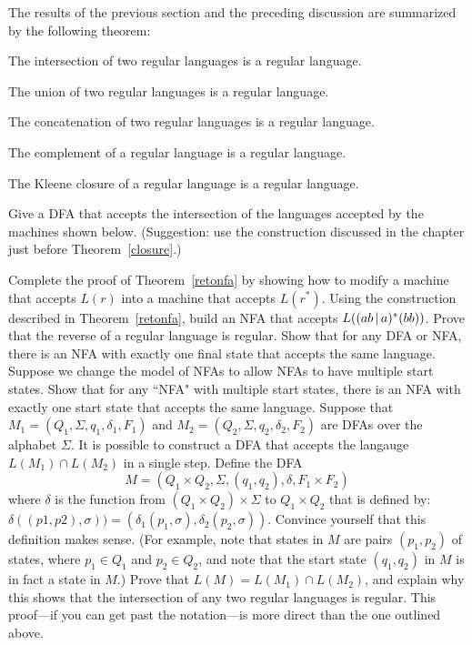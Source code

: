 The results of the previous section and the preceding discussion are summarized
by the following theorem:

\begin{theorem}\label{closure} 
The intersection  of two
regular languages is a regular language.  

The union of two
regular languages is a regular language.  

The concatenation of two
regular languages is a regular language.  

The complement of a regular language is a regular language.

The Kleene closure of a regular language is a regular language.
\end{theorem}
 

\begin{exercises}
\problem Give a DFA that accepts the intersection of the languages accepted by
the machines shown below.  (Suggestion: use the construction discussed in the
chapter just before Theorem~\ref{closure}.)

\fsafig{5ex}

\problem Complete the proof of Theorem~\ref{retonfa} by showing how to modify a
machine that accepts $L(r)$ into a machine that accepts $L(r^*)$.
\problem Using the construction described in Theorem~\ref{retonfa}, build an NFA
that accepts $L((ab\hbox{$\,|\,$} a)^*(bb))$.
\problem Prove that the reverse of a regular language is regular.
\problem Show that for any DFA or NFA, there is an NFA with exactly one final
state that accepts the same language.
\problem Suppose we change the model of NFAs to allow NFAs to have multiple
start states.  Show that for any ``NFA" with multiple start states, there is an
NFA with exactly one start state that accepts the same language.
\problem Suppose that $M_1=(Q_1,\Sigma,q_1,\delta_1,F_1)$ and 
$M_2=(Q_2,\Sigma,q_2,\delta_2,F_2)$ are DFAs over the alphabet $\Sigma$.  It is possible
to construct a DFA that accepts the langauge $L(M_1)\cap L(M_2)$ in a single step.
Define the DFA $$ M = (Q_1\times Q_2, \Sigma, (q_1,q_2), \delta, F_1\times F_2)$$
where $\delta$ is the function from $(Q_1\times Q_2)\times\Sigma$ to $Q_1\times Q_2$
that is defined by: $\delta((p1,p2),\sigma))=(\delta_1(p_1,\sigma),\delta_2(p_2,\sigma))$.
Convince yourself that this definition makes sense.  (For example, note that
states in $M$ are pairs $(p_1,p_2)$ of states, where $p_1\in Q_1$ and $p_2\in Q_2$,
and note that the start state $(q_1,q_2)$ in $M$ is in fact a state in $M$.)
Prove that $L(M)=L(M_1)\cap L(M_2)$, and explain why this shows that the intersection of
any two regular languages is regular.  This proof---if you can get past the
notation---is more direct than the one outlined above.

\end{exercises}


